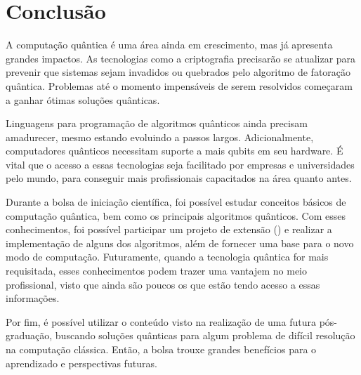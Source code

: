 \chapter{Conclusão}\label{ch:conclusao}

A computação quântica é uma área ainda em crescimento, mas já apresenta grandes impactos.
As tecnologias como a criptografia precisarão se atualizar para prevenir que sistemas sejam invadidos ou quebrados pelo algoritmo de fatoração quântica.
Problemas até o momento impensáveis de serem resolvidos começaram a ganhar ótimas soluções quânticas.

Linguagens para programação de algoritmos quânticos ainda precisam amadurecer, mesmo estando evoluindo a passos largos.
Adicionalmente, computadores quânticos necessitam suporte a mais qubits em seu hardware.
É vital que o acesso a essas tecnologias seja facilitado por empresas e universidades pelo mundo, para conseguir mais profissionais capacitados na área quanto antes.

Durante a bolsa de iniciação científica, foi possível estudar conceitos básicos de computação quântica, bem como os principais algoritmos quânticos.
Com esses conhecimentos, foi possível participar um projeto de extensão () e realizar a implementação de alguns dos algoritmos, além de fornecer uma base para o novo modo de computação.
Futuramente, quando a tecnologia quântica for mais requisitada, esses conhecimentos podem trazer uma vantajem no meio profissional, visto que ainda são poucos os que estão tendo acesso a essas informações.

Por fim, é possível utilizar o conteúdo visto na realização de uma futura pós-graduação, buscando soluções quânticas para algum problema de difícil resolução na computação clássica.
Então, a bolsa trouxe grandes benefícios para o aprendizado e perspectivas futuras.